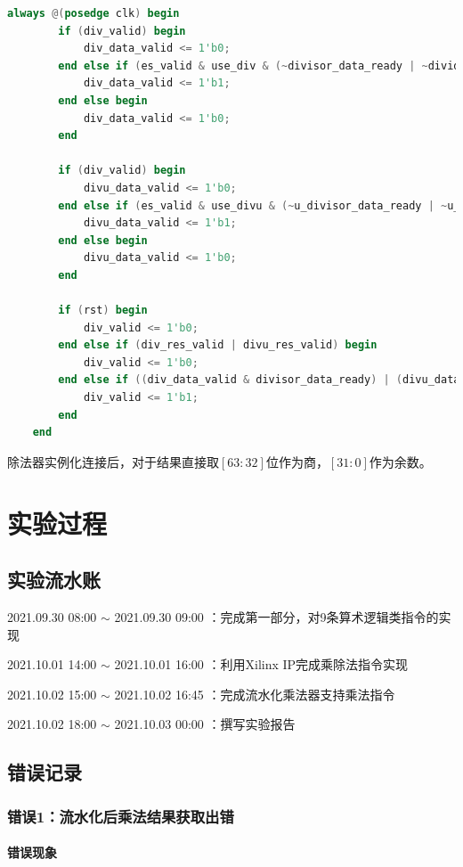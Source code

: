 \documentclass[UTF-8,twoside,c5size]{ctexart}
\begin{document}
	\begin{lstlisting}[language=verilog]
	always @(posedge clk) begin
		if (div_valid) begin
			div_data_valid <= 1'b0;
		end else if (es_valid & use_div & (~divisor_data_ready | ~dividend_data_ready)) begin
			div_data_valid <= 1'b1;
		end else begin
			div_data_valid <= 1'b0;
		end
		
		if (div_valid) begin
			divu_data_valid <= 1'b0;
		end else if (es_valid & use_divu & (~u_divisor_data_ready | ~u_dividend_data_ready)) begin
			divu_data_valid <= 1'b1;
		end else begin
			divu_data_valid <= 1'b0;
		end
		
		if (rst) begin
			div_valid <= 1'b0;
		end else if (div_res_valid | divu_res_valid) begin
			div_valid <= 1'b0;
		end else if ((div_data_valid & divisor_data_ready) | (divu_data_valid & u_divisor_data_ready)) begin
			div_valid <= 1'b1;
		end
	end
	\end{lstlisting}

	除法器实例化连接后，对于结果直接取$[63:32]$位作为商，$[31:0]$作为余数。
	
	\section{实验过程}
	
	\subsection{实验流水账}
	
	2021.09.30 08:00 $\sim$ 2021.09.30 09:00 ：完成第一部分，对9条算术逻辑类指令的实现
	
	2021.10.01 14:00 $\sim$ 2021.10.01 16:00 ：利用Xilinx IP完成乘除法指令实现
	
	2021.10.02 15:00 $\sim$ 2021.10.02 16:45 ：完成流水化乘法器支持乘法指令
	
	2021.10.02 18:00 $\sim$ 2021.10.03 00:00 ：撰写实验报告
	
	\subsection{错误记录}	
	\subsubsection{错误\textbf{1：}流水化后乘法结果获取出错}
	\paragraph{错误现象}\hfill
	
\end{document}
